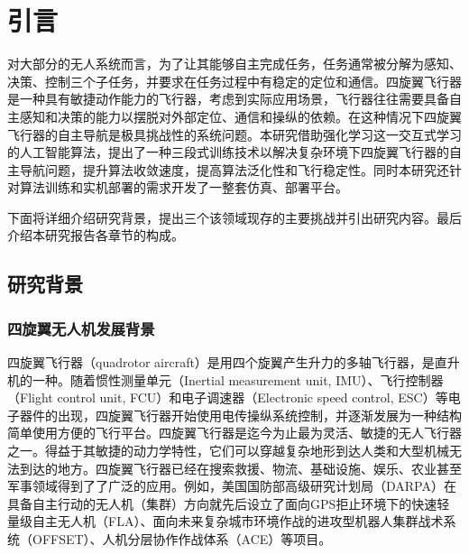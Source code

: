 
\chapter{引言}
对大部分的无人系统而言，为了让其能够自主完成任务，任务通常被分解为感知、决策、控制三个子任务，并要求在任务过程中有稳定的定位和通信。四旋翼飞行器是一种具有敏捷动作能力的飞行器，考虑到实际应用场景，飞行器往往需要具备自主感知和决策的能力以摆脱对外部定位、通信和操纵的依赖。在这种情况下四旋翼飞行器的自主导航是极具挑战性的系统问题。本研究借助强化学习这一交互式学习的人工智能算法，提出了一种三段式训练技术以解决复杂环境下四旋翼飞行器的自主导航问题，提升算法收敛速度，提高算法泛化性和飞行稳定性。同时本研究还针对算法训练和实机部署的需求开发了一整套仿真、部署平台。

下面将详细介绍研究背景，提出三个该领域现存的主要挑战并引出研究内容。最后介绍本研究报告各章节的构成。

\section{研究背景}
\label{background}
\subsection{四旋翼无人机发展背景}
四旋翼飞行器（quadrotor aircraft）是用四个旋翼产生升力的多轴飞行器，是直升机的一种。随着惯性测量单元（Inertial measurement unit, IMU）、飞行控制器（Flight control unit, FCU）和电子调速器（Electronic speed control, ESC）等电子器件的出现，四旋翼飞行器开始使用电传操纵系统控制，并逐渐发展为一种结构简单使用方便的飞行平台。四旋翼飞行器是迄今为止最为灵活、敏捷的无人飞行器之一\cite{verbeke2018experimental}\cite{ackermann2020ai}。得益于其敏捷的动力学特性，它们可以穿越复杂地形到达人类和大型机械无法到达的地方。四旋翼飞行器已经在搜索救援、物流、基础设施、娱乐、农业甚至军事领域得到了了广泛的应用。例如，美国国防部高级研究计划局（DARPA）在具备自主行动的无人机（集群）方向就先后设立了面向GPS拒止环境下的快速轻量级自主无人机（FLA）、面向未来复杂城市环境作战的进攻型机器人集群战术系统（OFFSET）、人机分层协作作战体系（ACE）等项目\cite{darpa2023}。

